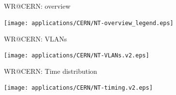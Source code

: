 \documentclass[compress,red]{beamer}
\begin{document}
\subsection{}
\begin{frame}{WR@CERN: overview}


      \begin{center}
	\texttt{[image: applications/CERN/NT-overview\_legend.eps]}
      \end{center}  

\end{frame}
\begin{frame}{WR@CERN: VLANs}

      \begin{center}
	\texttt{[image: applications/CERN/NT-VLANs.v2.eps]}
      \end{center}  

\end{frame}
\begin{frame}{WR@CERN: Time distribution}


      \begin{center}
	\texttt{[image: applications/CERN/NT-timing.v2.eps]}
      \end{center}  

\end{frame}
\end{document}
